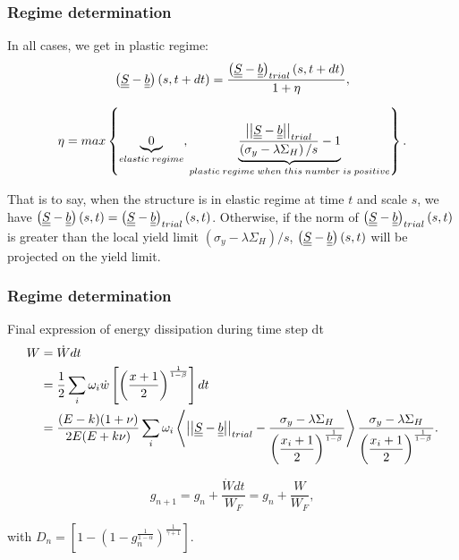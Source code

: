 \documentclass[xcolor=table]{Bredelebeamer}
\begin{document}
\begin{frame}
	\frametitle{Regime determination}
	
	\begin{block}{In all cases, we get in plastic regime:}	
\begin{equation}
\left( \uline{\uline{S}}-\uline{\uline{b}}\right) (s,t+dt)=\dfrac{\left( \uline{\uline{S}}-\uline{\uline{b}}\right)_{trial} (s,t+dt)}{1+\eta},
\end{equation}

$$\eta=max\left\lbrace \underbrace{0}_{elastic\; regime}, \underbrace{\dfrac{\left| \left|\uline{\uline{S}}-\uline{\uline{b}}\right| \right|_{trial}}{\left( \sigma_y-\lambda \Sigma_H\right)/s}-1}_{plastic \; regime\; when\; this\; number\; is\; positive}\right\rbrace. $$
	\end{block}
 That is to say, when the structure is in elastic regime at time $t$ and scale $s$, we have $\left( \uline{\uline{S}}-\uline{\uline{b}}\right)(s,t)=\left( \uline{\uline{S}}-\uline{\uline{b}}\right)_{trial} (s,t)$. Otherwise, if  the norm of $\left( \uline{\uline{S}}-\uline{\uline{b}}\right)_{trial} (s,t)$ is greater than the local yield limit $\left( \sigma_y-\lambda \Sigma_H\right)/s$, $\left( \uline{\uline{S}}-\uline{\uline{b}}\right)(s,t)$ will be projected on the yield limit. 	
\end{frame}	

\begin{frame}
	\frametitle{Regime determination}
	\begin{block}{Final expression of energy dissipation during time step dt }	
	\begin{equation}
	\begin{split}
	W&=\dot{W}dt
	\\&=\frac{1}{2}\sum_{i}\omega_i\dot{w}\left[  \left( \frac{x+1}{2}\right) ^{\frac{1}{1-\beta}}\right]dt
	\\&=\dfrac{(E-k)(1+\nu) }{2E(E+k\nu)}\sum_{i}\omega_i\left\langle  \left| \left|\uline{\uline{S}}-\uline{\uline{b}}\right| \right|_{trial}-\dfrac{\sigma_y-\lambda \Sigma_H}{\left( \dfrac{x_i+1}{2}\right) ^{\frac{1}{1-\beta}}}\right\rangle \dfrac{\sigma_y-\lambda \Sigma_H}{\left( \dfrac{x_i+1}{2}\right) ^{\frac{1}{1-\beta}}}.
	\end{split}
	\label{finaldw}
	\end{equation}
	\end{block}

$$g_{n+1}=g_n+\dfrac{\dot{W}dt}{W_F}=g_n+\dfrac{W}{W_F},$$

with $D_n=\left[1-\left(1-g_n^{\frac{1}{1-\alpha}} \right)^{\frac{1}{\gamma+1}}  \right] $.

\end{frame}	
\end{document}
